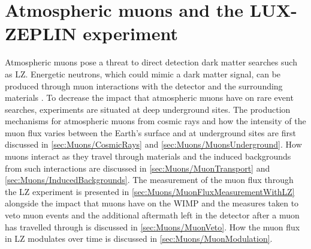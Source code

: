 \chapter{Atmospheric muons and the LUX-ZEPLIN experiment}\label{chap:Muons}
Atmospheric muons pose a threat to direct detection dark matter searches such as LZ. Energetic neutrons, which could mimic a dark matter signal, can be produced through muon interactions with the detector and the surrounding materials \cite{LZ_SIMS}. To decrease the impact that atmospheric muons have on rare event searches, experiments are situated at deep underground sites. 
The production mechanisms for atmospheric muons from cosmic rays and how the intensity of the muon flux varies between the Earth's surface and at underground sites are first discussed in \autoref{sec:Muons/CosmicRays} and \autoref{sec:Muons/MuonsUnderground}. How muons interact as they travel through materials and the induced backgrounds from such interactions are discussed in \autoref{sec:Muons/MuonTransport} and \autoref{sec:Muons/InducedBackgrounds}. The measurement of the muon flux through the LZ experiment is presented in \autoref{sec:Muons/MuonFluxMeasurementWithLZ} alongside the impact that muons have on the WIMP and the measures taken to veto muon events and the additional aftermath left in the detector after a muon has travelled through is discussed in \autoref{sec:Muons/MuonVeto}. How the muon flux in LZ modulates over time is discussed in \autoref{sec:Muons/MuonModulation}.

